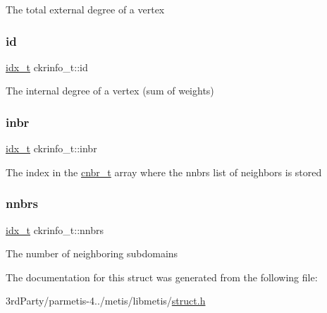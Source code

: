 The total external degree of a vertex \mbox{\label{structckrinfo__t_a6d1da388f70555f25dc90fdcc011bb9b}} 
\subsubsection{\texorpdfstring{id}{id}}
{\footnotesize\ttfamily \hyperlink{3rd_party_2parmetis-4_80_83_2metis_2include_2metis_8h_aaa5262be3e700770163401acb0150f52}{idx\+\_\+t} ckrinfo\+\_\+t\+::id}

The internal degree of a vertex (sum of weights) \mbox{\label{structckrinfo__t_aca4e2d97adbc1b6401b4ee8acba70770}} 
\subsubsection{\texorpdfstring{inbr}{inbr}}
{\footnotesize\ttfamily \hyperlink{3rd_party_2parmetis-4_80_83_2metis_2include_2metis_8h_aaa5262be3e700770163401acb0150f52}{idx\+\_\+t} ckrinfo\+\_\+t\+::inbr}

The index in the \hyperlink{structcnbr__t}{cnbr\+\_\+t} array where the nnbrs list of neighbors is stored \mbox{\label{structckrinfo__t_a73fbc8555b843b3fd414ac0a9ec244f1}} 
\subsubsection{\texorpdfstring{nnbrs}{nnbrs}}
{\footnotesize\ttfamily \hyperlink{3rd_party_2parmetis-4_80_83_2metis_2include_2metis_8h_aaa5262be3e700770163401acb0150f52}{idx\+\_\+t} ckrinfo\+\_\+t\+::nnbrs}

The number of neighboring subdomains 

The documentation for this struct was generated from the following file\+:\begin{DoxyCompactItemize}
\item 
3rd\+Party/parmetis-\/4../metis/libmetis/\hyperlink{metis_2libmetis_2struct_8h}{struct.\+h}\end{DoxyCompactItemize}
